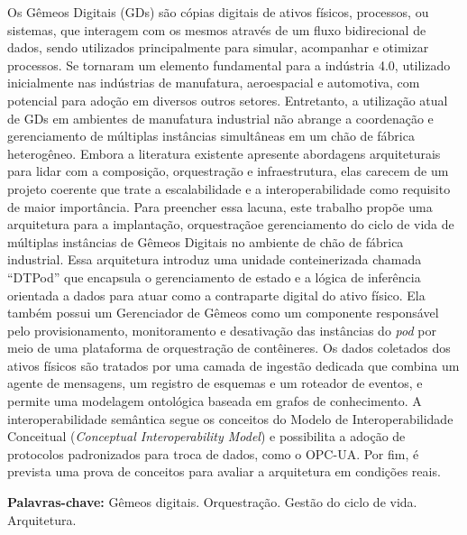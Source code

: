 \begin{resumo}[Resumo]
  Os Gêmeos Digitais (GDs) são cópias digitais de ativos físicos, processos, ou sistemas, que interagem com os mesmos através de um 
  fluxo bidirecional de dados, sendo utilizados principalmente para simular, acompanhar e otimizar processos. Se tornaram um elemento 
  fundamental para a indústria 4.0, utilizado inicialmente nas indústrias de manufatura, aeroespacial e automotiva, com potencial 
  para adoção em diversos outros setores. Entretanto, a utilização atual de GDs em ambientes de manufatura industrial não abrange a 
  coordenação e gerenciamento de múltiplas instâncias simultâneas em um chão de fábrica heterogêneo. Embora a literatura existente 
  apresente abordagens arquiteturais para lidar com a composição, orquestração e infraestrutura, elas carecem de um projeto coerente 
  que trate a escalabilidade e a interoperabilidade como requisito de maior importância. Para preencher essa lacuna, este trabalho 
  propõe uma arquitetura para a implantação, orquestraçãoe gerenciamento do ciclo de vida de múltiplas instâncias de Gêmeos Digitais 
  no ambiente de chão de fábrica industrial. Essa arquitetura introduz uma unidade conteinerizada chamada ``DTPod'' que encapsula o 
  gerenciamento de estado e a lógica de inferência orientada a dados para atuar como a contraparte digital do ativo físico. Ela 
  também possui um Gerenciador de Gêmeos como um componente responsável pelo provisionamento, monitoramento e desativação das 
  instâncias do \textit{pod} por meio de uma plataforma de orquestração de contêineres. Os dados coletados dos ativos físicos são 
  tratados por uma camada de ingestão dedicada que combina um agente de mensagens, um registro de esquemas e um roteador de eventos, 
  e permite uma modelagem ontológica baseada em grafos de conhecimento. A interoperabilidade semântica segue os conceitos do Modelo 
  de Interoperabilidade Conceitual (\textit{Conceptual Interoperability Model}) e possibilita a adoção de protocolos padronizados 
  para troca de dados, como o OPC-UA. Por fim, é prevista uma prova de conceitos para avaliar a arquitetura em condições reais.

  \vspace{\baselineskip} 
  \textbf{Palavras-chave:} Gêmeos digitais. Orquestração. Gestão do ciclo de vida. Arquitetura.
\end{resumo}


